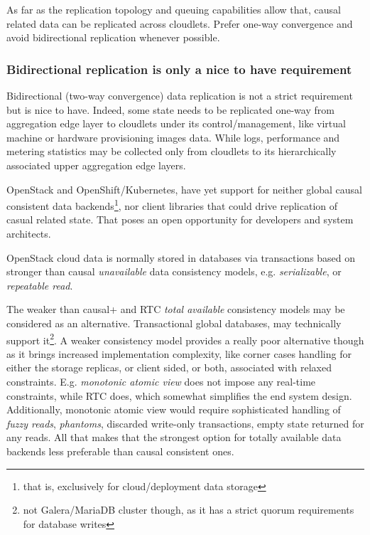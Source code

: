 \documentclass[conference]{IEEEtran}
\begin{document}
As far as the replication topology and queuing capabilities allow
that, causal related data can be replicated across cloudlets. Prefer one-way
convergence and avoid bidirectional replication whenever possible.

\subsubsection{Bidirectional replication is only a nice to have requirement}

Bidirectional (two-way convergence) data replication is not a strict
requirement but is nice to have. Indeed, some state needs to be replicated
one-way from aggregation edge layer to cloudlets under its control/management,
like virtual machine or hardware provisioning images data. While logs,
performance and metering statistics may be collected only from cloudlets to its
hierarchically associated upper aggregation edge layers.

OpenStack and OpenShift/Kubernetes, have yet support for neither global causal
consistent data backends\footnote{that is, exclusively for cloud/deployment
data storage}, nor client libraries that could drive replication of casual
related state. That poses an open opportunity for developers and system
architects.

OpenStack cloud data is normally stored in databases via
transactions based on stronger than causal \textit{unavailable}\cite{b4} data
consistency models, e.g. \textit{serializable}\cite{b4}, or \textit{repeatable
read}\cite{b4}.

The weaker than causal+ and RTC \textit{total available}\cite{b4}
consistency models may be considered as an alternative. Transactional global
databases\cite{b5}, may technically support it\footnote{not Galera/MariaDB
cluster though, as it has a strict quorum requirements for database writes}. A
weaker consistency model provides a really poor alternative though as it brings
increased implementation complexity, like corner cases handling for either the
storage replicas, or client sided, or both, associated with relaxed
constraints. E.g. \textit{monotonic atomic view}\cite{b4} does not impose any
real-time constraints, while RTC does, which somewhat simplifies
the end system design. Additionally, monotonic atomic view would require
sophisticated handling of \textit{fuzzy reads}\cite{b4},
\textit{phantoms}\cite{b4}, discarded write-only transactions, empty state
returned for any reads. All that makes that the strongest option for totally
available data backends less preferable than causal consistent ones.
\end{document}

